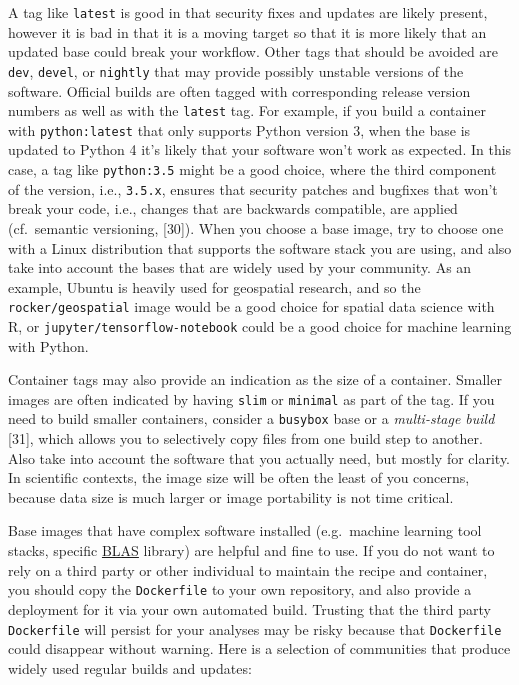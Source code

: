 \documentclass[10pt,letterpaper]{article}
\begin{document}
A tag like \texttt{latest} is good in that security fixes and updates
are likely present, however it is bad in that it is a moving target so
that it is more likely that an updated base could break your workflow.
Other tags that should be avoided are \texttt{dev}, \texttt{devel}, or
\texttt{nightly} that may provide possibly unstable versions of the
software. Official builds are often tagged with corresponding release
version numbers as well as with the \texttt{latest} tag. For example, if
you build a container with \texttt{python:latest} that only supports
Python version 3, when the base is updated to Python 4 it's likely that
your software won't work as expected. In this case, a tag like
\texttt{python:3.5} might be a good choice, where the third component of
the version, i.e., \texttt{3.5.x}, ensures that security patches and
bugfixes that won't break your code, i.e., changes that are backwards
compatible, are applied (cf.~semantic versioning, {[}30{]}). When you
choose a base image, try to choose one with a Linux distribution that
supports the software stack you are using, and also take into account
the bases that are widely used by your community. As an example, Ubuntu
is heavily used for geospatial research, and so the
\texttt{rocker/geospatial} image would be a good choice for spatial data
science with R, or \texttt{jupyter/tensorflow-notebook} could be a good
choice for machine learning with Python.

Container tags may also provide an indication as the size of a
container. Smaller images are often indicated by having \texttt{slim} or
\texttt{minimal} as part of the tag. If you need to build smaller
containers, consider a \texttt{busybox} base or a \emph{multi-stage
build} {[}31{]}, which allows you to selectively copy files from one
build step to another. Also take into account the software that you
actually need, but mostly for clarity. In scientific contexts, the image
size will be often the least of you concerns, because data size is much
larger or image portability is not time critical.

Base images that have complex software installed (e.g.~machine learning
tool stacks, specific
\href{https://en.wikipedia.org/wiki/Basic_Linear_Algebra_Subprograms}{BLAS}
library) are helpful and fine to use. If you do not want to rely on a
third party or other individual to maintain the recipe and container,
you should copy the \texttt{Dockerfile} to your own repository, and also
provide a deployment for it via your own automated build. Trusting that
the third party \texttt{Dockerfile} will persist for your analyses may
be risky because that \texttt{Dockerfile} could disappear without
warning. Here is a selection of communities that produce widely used
regular builds and updates:
\end{document}
